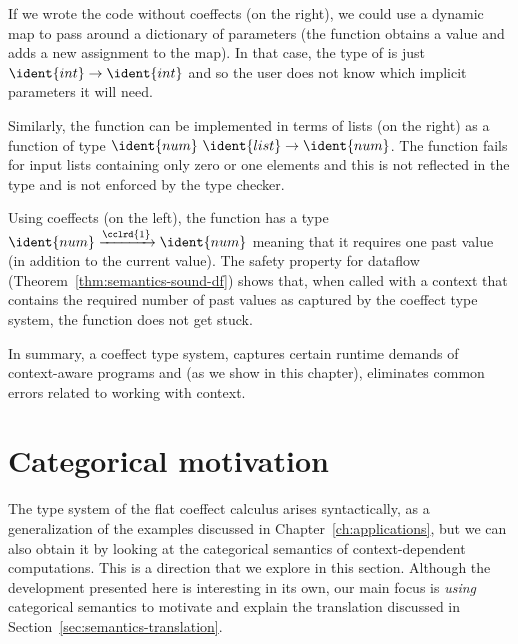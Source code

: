 If we wrote the code without coeffects (on the right), we could use a dynamic map to pass around
a dictionary of parameters (the  function obtains a value and  adds a new
assignment to the map). In that case, the type of  is just $\ident{int}\rightarrow\ident{int}$
and so the user does not know which implicit parameters it will need.

Similarly, the  function can be implemented in terms of lists (on the right) as
a function of type $\ident{num}~\ident{list}\rightarrow\ident{num}$. The function fails for input
lists containing only zero or one elements and this is not reflected in the type and is not
enforced by the type checker.

Using coeffects (on the left), the function has a type $\ident{num}\xrightarrow{\cclrd{1}}\ident{num}$
meaning that it requires one past value (in addition to the current value). The safety property
for dataflow (Theorem~\ref{thm:semantics-sound-df}) shows that, when called with a context that
contains the required number of past values as captured by the coeffect type system, the function
does not get stuck.

In summary, a coeffect type system, captures certain runtime
demands of context-aware programs and (as we show in this chapter), eliminates common errors
related to working with context.



%
%

\section{Categorical motivation}
\label{sec:semantics-theory}

The type system of the flat coeffect calculus arises syntactically, as a generalization of the examples
discussed in Chapter~\ref{ch:applications}, but we can also obtain it by looking at the categorical
semantics of context-dependent computations. This is a direction that we explore in this section.
Although the development presented here is interesting in its own, our main focus is \emph{using}
categorical semantics to motivate and explain the translation discussed in
Section~\ref{sec:semantics-translation}.

